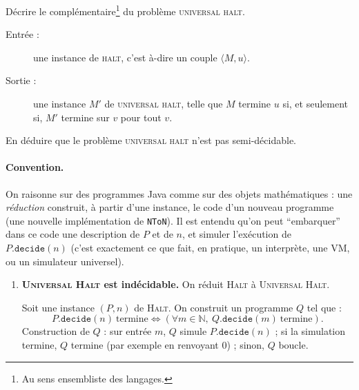 \begin{exercice}
  \begin{questions}
  \item Décrire le complémentaire\footnote{Au sens ensembliste des langages.}
    du problème \textsc{universal halt}.
  \end{questions}
  \begin{corrections}
    \begin{description}
    \item[Entrée :] une instance de \textsc{halt}, c'est à-dire un couple $\langle M, u \rangle$.
    \item[Sortie :] une instance $M'$ de \textsc{universal halt}, telle que $M$ termine $u$ si,
      et seulement si, $M'$ termine sur $v$ pour tout $v$. 
    \end{description}
  \end{corrections}

  \begin{questions}
  \item En déduire que le problème \textsc{universal halt} n'est pas semi-décidable.
  \end{questions}

  \ifdefined\CORRECTION

  \begin{corrections}

    \paragraph{Convention.}
    On raisonne sur des programmes Java comme sur des objets mathématiques : une \emph{réduction} construit,
    à partir d'une instance, le code d'un nouveau programme (une nouvelle implémentation de \texttt{NToN}).
    Il est entendu qu'on peut ``embarquer'' dans ce code une description de $P$ et de $n$,
    et simuler l'exécution de $P.\texttt{decide}(n)$ (c'est exactement ce que fait, en pratique, un interprète, une VM,
    ou un simulateur universel).

    \begin{enumerate}

    \item \textbf{\textsc{Universal Halt} est indécidable.}
      On réduit \textsc{Halt} à \textsc{Universal Halt}.

      Soit une instance $(P,n)$ de \textsc{Halt}. On construit un programme $Q$ tel que :
      \[
      P.\texttt{decide}(n)\ \text{termine}
      \iff
      (\forall m\in\mathbb{N},\ Q.\texttt{decide}(m)\ \text{termine}).
      \]
      Construction de $Q$ : sur entrée $m$, $Q$ simule $P.\texttt{decide}(n)$ ; si la simulation termine,
      $Q$ termine (par exemple en renvoyant $0$) ; sinon, $Q$ boucle.


\end{enumerate}
\end{corrections}
\end{exercice}
